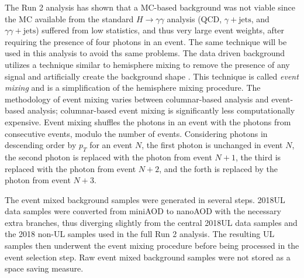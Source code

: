 \documentclass[12pt]{article}
\begin{document}
The Run 2 analysis has shown that a MC-based background was not viable since the MC available from the standard $H \rightarrow \gamma\gamma$ analysis (QCD, $\gamma + \mathrm{jets}$, and $\gamma\gamma + \mathrm{jets}$) suffered from low statistics, and thus very large event weights, after requiring the presence of four photons in an event. The same technique will be used in this analysis to avoid ths same problems. The data driven background utilizes a technique similar to hemisphere mixing to remove the presence of any signal and artificially create the background shape \cite{hemisphere_mixing}. This technique is called \textit{event mixing} and is a simplification of the hemisphere mixing procedure. The methodology of event mixing varies between columnar-based analysis and event-based analysis; columnar-based event mixing is significantly less computationally expensive. Event mixing shuffles the photons in an event with the photons from consecutive events, modulo the number of events. Considering photons in descending order by $p_T$ for an event $N$, the first photon is unchanged in event $N$, the second photon is replaced with the photon from event $N+1$, the third is replaced with the photon from event $N+2$, and the forth is replaced by the photon from event $N+3$.\par

The event mixed background samples were generated in several steps. 2018UL data samples were converted from miniAOD to nanoAOD with the necessary extra branches, thus diverging slightly from the central 2018UL data samples and the 2018 non-UL samples used in the full Run 2 analysis. The resulting UL samples then underwent the event mixing procedure before being processed in the event selection step. Raw event mixed background samples were not stored as a space saving measure.\par
\end{document}
